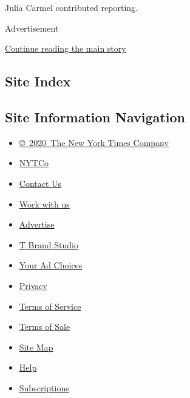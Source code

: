Julia Carmel contributed reporting.

Advertisement

\protect\hyperlink{after-bottom}{Continue reading the main story}

\hypertarget{site-index}{%
\subsection{Site Index}\label{site-index}}

\hypertarget{site-information-navigation}{%
\subsection{Site Information
Navigation}\label{site-information-navigation}}

\begin{itemize}
\tightlist
\item
  \href{https://help.nytimes3xbfgragh.onion/hc/en-us/articles/115014792127-Copyright-notice}{©~2020~The
  New York Times Company}
\end{itemize}

\begin{itemize}
\tightlist
\item
  \href{https://www.nytco.com/}{NYTCo}
\item
  \href{https://help.nytimes3xbfgragh.onion/hc/en-us/articles/115015385887-Contact-Us}{Contact
  Us}
\item
  \href{https://www.nytco.com/careers/}{Work with us}
\item
  \href{https://nytmediakit.com/}{Advertise}
\item
  \href{http://www.tbrandstudio.com/}{T Brand Studio}
\item
  \href{https://www.nytimes3xbfgragh.onion/privacy/cookie-policy\#how-do-i-manage-trackers}{Your
  Ad Choices}
\item
  \href{https://www.nytimes3xbfgragh.onion/privacy}{Privacy}
\item
  \href{https://help.nytimes3xbfgragh.onion/hc/en-us/articles/115014893428-Terms-of-service}{Terms
  of Service}
\item
  \href{https://help.nytimes3xbfgragh.onion/hc/en-us/articles/115014893968-Terms-of-sale}{Terms
  of Sale}
\item
  \href{https://spiderbites.nytimes3xbfgragh.onion}{Site Map}
\item
  \href{https://help.nytimes3xbfgragh.onion/hc/en-us}{Help}
\item
  \href{https://www.nytimes3xbfgragh.onion/subscription?campaignId=37WXW}{Subscriptions}
\end{itemize}
